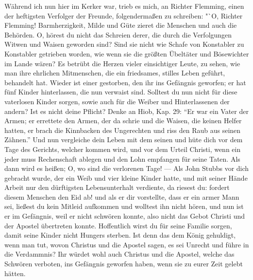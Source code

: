 Während ich nun hier im Kerker war, trieb es mich, an
Richter Flemming, einen der heftigsten Verfolger der Freunde,
folgendermaßen zu schreiben: "`O, Richter Flemming! Barmherzigkeit, 
Milde und Güte zieret die Menschen und auch die Behörden.
O, hörest du nicht das Schreien derer, die durch die Verfolgungen
Witwen und Waisen geworden sind? Sind sie nicht wie
Schafe von Konstabler zu Konstabler getrieben worden, wie wenn
sie die größten Übeltäter und Bösewichter im Lande wären? Es
betrübt die Herzen vieler einsichtiger Leute, zu sehen, wie man
ihre ehrlichen Mitmenschen, die ein friedsames, stilles Leben geführt,
behandelt hat. Wieder ist einer gestorben, den ihr ins Gefängnis 
geworfen; er hat fünf Kinder hinterlassen, die nun verwaist 
sind. Solltest du nun nicht für diese vaterlosen Kinder
sorgen, sowie auch für die Weiber und Hinterlassenen der andern?
Ist es nicht deine Pflicht? Denke an Hiob, Kap. 29:
"`Er war ein Vater der Armen; er errettete den Armen, der da schrie und
die Waisen, die keinen Helfer hatten, er brach die Kinnbacken des
Ungerechten und riss den Raub aus seinen Zähnen."' Und nun
vergleiche dein Leben mit dem seinen und hüte dich vor dem Tage
des Gerichts, welcher kommen wird, und vor dem Urteil Christi,
wenn ein jeder muss Rechenschaft ablegen und den Lohn empfangen
für seine Taten. Als dann wird es heißen; O, wo sind die verlorenen 
Tage! — Als John Stubbs vor dich gebracht wurde, der
ein Weib und vier kleine Kinder hatte, und mit seiner Hände
Arbeit nur den dürftigsten Lebensunterhalt verdiente, da riesest
du: fordert diesem Menschen den Eid ab! und als er dir vorstellte, 
dass er ein armer Mann sei, ließest du kein Mitleid aufkommen 
und wolltest ihn nicht hören, und nun ist er im Gefängnis, 
weil er nicht schwören konnte, also nicht das Gebot
Christi und der Apostel übertreten konnte. Hoffentlich wirst du für
seine Familie sorgen, damit seine Kinder nicht Hungers sterben.
Ist denn das dem König gehuldigt, wenn man tut, wovon Christus
und die Apostel sagen, es sei Unrecht und führe in die Verdammnis? 
Ihr würdet wohl auch Christus und die Apostel, welche
das Schwören verboten, ins Gefängnis geworfen haben, wenn sie
zu eurer Zeit gelebt hätten.

